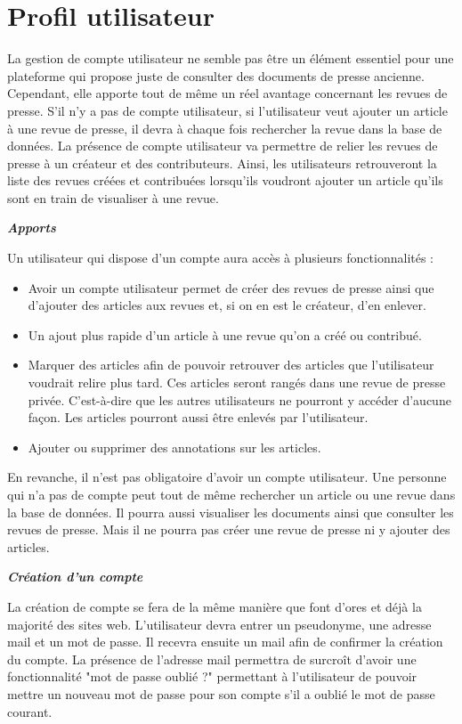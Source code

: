\section{Profil utilisateur}
\label{sec:profil}

La gestion de compte utilisateur ne semble pas être un élément essentiel pour une plateforme qui propose juste de consulter des documents de presse ancienne. Cependant, elle apporte tout de même un réel avantage concernant les revues de presse.
S'il n'y a pas de compte utilisateur, si l'utilisateur veut ajouter un article à une revue de presse, il devra à chaque fois rechercher la revue dans la base de données.
La présence de compte utilisateur va permettre de relier les revues de presse à un créateur et des contributeurs. Ainsi, les utilisateurs retrouveront la liste des revues créées et contribuées lorsqu'ils voudront ajouter un article qu'ils sont en train de visualiser à une revue.


\textbf{\textit{Apports}}
 

Un utilisateur qui dispose d'un compte aura accès à plusieurs fonctionnalités :

\begin{itemize}
  \item Avoir un compte utilisateur permet de créer des revues de presse ainsi que d'ajouter des articles aux revues et, si on en est le créateur, d'en enlever.
  \item Un ajout plus rapide d'un article à une revue qu'on a créé ou contribué.
  \item Marquer des articles afin de pouvoir retrouver des articles que l'utilisateur voudrait relire plus tard. Ces articles seront rangés dans une revue de presse privée. C'est-à-dire que les autres utilisateurs ne pourront y accéder d'aucune façon. Les articles pourront aussi être enlevés par l'utilisateur.
	\item Ajouter ou supprimer des annotations sur les articles.
\end{itemize}

En revanche, il n'est pas obligatoire d'avoir un compte utilisateur. Une personne qui n'a pas de compte peut tout de même rechercher un article ou une revue dans la base de données. Il pourra aussi visualiser les documents ainsi que consulter les revues de presse. Mais il ne pourra pas créer une revue de presse ni y ajouter des articles.


\textbf{\textit{Création d'un compte}}


La création de compte se fera de la même manière que font d'ores et déjà la majorité des sites web. L'utilisateur devra entrer un pseudonyme, une adresse mail et un mot de passe. Il recevra ensuite un mail afin de confirmer la création du compte. La présence de l'adresse mail permettra de surcroît d'avoir une fonctionnalité "mot de passe oublié ?" permettant à l'utilisateur de pouvoir mettre un nouveau mot de passe pour son compte s'il a oublié le mot de passe courant.


